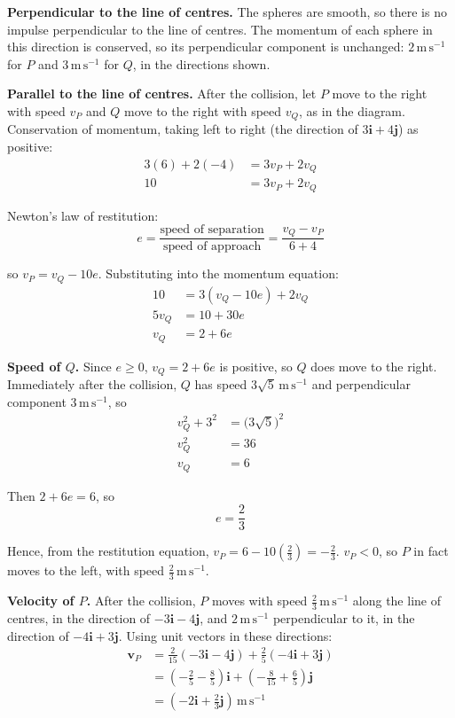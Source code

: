 \documentclass[leqno]{article}
\begin{document}
\begin{enumerate}[
  label=\textbf{\arabic*.},
  leftmargin=*,
  topsep=0pt,
  partopsep=0pt,
  parsep=0pt
]
\begin{djsSolution}
\begin{enumerate}[label=\textbf{(\alph*)}, start=1]
\textbf{Perpendicular to the line of centres.} The spheres are smooth, so there is no impulse perpendicular to the line of centres. The momentum of each sphere in this direction is conserved, so its perpendicular component is unchanged: \(2\,\mathrm{m\,s^{-1}}\) for \(P\) and \(3\,\mathrm{m\,s^{-1}}\) for \(Q\), in the directions shown.

\textbf{Parallel to the line of centres.} After the collision, let \(P\) move to the right with speed \(v_P\) and \(Q\) move to the right with speed \(v_Q\), as in the diagram. Conservation of momentum, taking left to right (the direction of \(3\mathbf{i}+4\mathbf{j}\)) as positive:
\begin{align*}
3(6)+2(-4)&=3v_P+2v_Q\\
10&=3v_P+2v_Q
\end{align*}

Newton's law of restitution:
\[
e=\frac{\text{speed of separation}}{\text{speed of approach}}=\frac{v_Q-v_P}{6+4}
\]

so \(v_P=v_Q-10e\). Substituting into the momentum equation:
\begin{align*}
10&=3(v_Q-10e)+2v_Q\\
5v_Q&=10+30e\\
v_Q&=2+6e
\end{align*}

\textbf{Speed of \(Q\).} Since \(e\geq0\), \(v_Q=2+6e\) is positive, so \(Q\) does move to the right. Immediately after the collision, \(Q\) has speed \(3\sqrt5\,\mathrm{m\,s^{-1}}\) and perpendicular component \(3\,\mathrm{m\,s^{-1}}\), so
\begin{align*}
v_Q^2+3^2&=\bigl(3\sqrt5\bigr)^2\\
v_Q^2&=36\\
v_Q&=6
\end{align*}

Then \(2+6e=6\), so
\[
e=\frac23
\]

Hence, from the restitution equation, \(v_P=6-10\left(\frac23\right)=-\frac23\). \(v_P<0\), so \(P\) in fact moves to the left, with speed \(\frac23\,\mathrm{m\,s^{-1}}\).

\textbf{Velocity of \(P\).} After the collision, \(P\) moves with speed \(\frac23\,\mathrm{m\,s^{-1}}\) along the line of centres, in the direction of \(-3\mathbf{i}-4\mathbf{j}\), and \(2\,\mathrm{m\,s^{-1}}\) perpendicular to it, in the direction of \(-4\mathbf{i}+3\mathbf{j}\). Using unit vectors in these directions:
\begin{align*}
\mathbf{v}_P&=\frac{2}{15}(-3\mathbf{i}-4\mathbf{j})+\frac25(-4\mathbf{i}+3\mathbf{j})\\
&=\left(-\frac25-\frac85\right)\mathbf{i}+\left(-\frac{8}{15}+\frac65\right)\mathbf{j}\\
&=\left(-2\mathbf{i}+\frac{2}{3}\mathbf{j}\right)\,\mathrm{m\,s^{-1}}
\end{align*}


\end{enumerate}
\end{djsSolution}
\end{enumerate}
\end{document}
